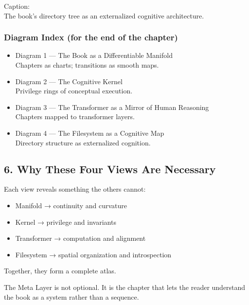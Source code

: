 \documentclass[
]{article}
\providecommand{\tightlist}{%
  \setlength{\itemsep}{0pt}\setlength{\parskip}{0pt}}
\begin{document}
Caption:\\
The book's directory tree as an externalized cognitive architecture.

\hypertarget{diagram-index-for-the-end-of-the-chapter}{%
\subsubsection{Diagram Index (for the end of the
chapter)}\label{diagram-index-for-the-end-of-the-chapter}}

\begin{itemize}
\tightlist
\item
  Diagram 1 --- The Book as a Differentiable Manifold\\
  Chapters as charts; transitions as smooth maps.
\item
  Diagram 2 --- The Cognitive Kernel\\
  Privilege rings of conceptual execution.
\item
  Diagram 3 --- The Transformer as a Mirror of Human Reasoning\\
  Chapters mapped to transformer layers.
\item
  Diagram 4 --- The Filesystem as a Cognitive Map\\
  Directory structure as externalized cognition.
\end{itemize}

\hypertarget{why-these-four-views-are-necessary}{%
\subsection{6. Why These Four Views Are
Necessary}\label{why-these-four-views-are-necessary}}

Each view reveals something the others cannot:

\begin{itemize}
\tightlist
\item
  Manifold → continuity and curvature
\item
  Kernel → privilege and invariants
\item
  Transformer → computation and alignment
\item
  Filesystem → spatial organization and introspection
\end{itemize}

Together, they form a complete atlas.

The Meta Layer is not optional. It is the chapter that lets the reader
understand the book as a system rather than a sequence.
\end{document}
